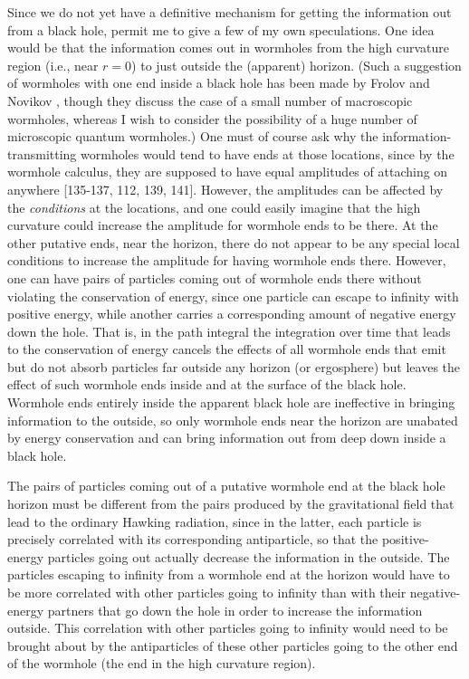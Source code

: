 	    Since we do not yet have a definitive mechanism for
getting the
information out from a black hole, permit me to give a few of my own
speculations.  One idea would be that the information comes out in
wormholes
from the high curvature region (i.e., near $r=0$) to just outside the
(apparent) horizon.
(Such a suggestion of wormholes with one end inside a black hole has
been made by Frolov and Novikov \cite{FroNov}, though they
discuss the case of a small number of macroscopic wormholes,
whereas I wish to consider the possibility of a huge number of
microscopic quantum wormholes.)
One must of course ask why the information-transmitting
wormholes would tend to have ends at those locations, since by the
wormhole
calculus, they are supposed to have equal amplitudes of attaching on
anywhere
[135-137, 112, 139, 141].
However, the amplitudes can be affected by the {\it conditions} at
the
locations, and one could easily imagine that the high curvature could
increase
the amplitude for wormhole ends to be there.  At the other putative
ends, near
the horizon, there do not appear to be any special local conditions
to increase
the amplitude for having wormhole ends there.  However, one can have
pairs of
particles coming out of wormhole ends there without violating the
conservation
of energy, since one particle can escape to infinity with positive
energy,
while another carries a corresponding amount of negative energy down
the hole.
That is, in the path integral the integration over time that leads to
the
conservation of energy cancels the effects of all wormhole ends that
emit
but do not absorb particles far outside any horizon (or ergosphere)
but leaves the effect of such wormhole ends inside and at
the surface of the black hole.  Wormhole ends entirely inside the
apparent
black hole are ineffective in bringing information to the outside, so
only
wormhole ends near the horizon are unabated by energy conservation
and can
bring information out from deep down inside a black hole.

	The pairs of particles coming out of a putative wormhole end
at the black hole
horizon must be different from the pairs produced by the
gravitational field
that lead to the ordinary Hawking radiation, since in the latter,
each particle
is precisely correlated with its corresponding antiparticle, so that
the
positive-energy particles going out actually decrease the information
in the
outside.  The particles escaping to infinity from a wormhole end at
the horizon
would have to be more correlated with other particles going to
infinity than
with their negative-energy partners that go down the hole in order to
increase the information outside.  This correlation with other
particles going
to infinity would need to be brought about by the antiparticles of
these other
particles going to the other end of the wormhole (the end in the high
curvature
region).

